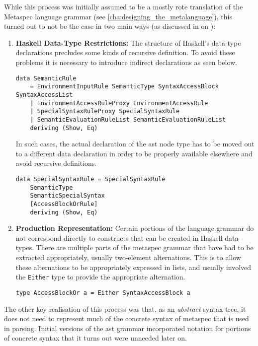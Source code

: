 While this process was initially assumed to be a mostly rote translation of the Metaspec language grammar (see \autoref{cha:designing_the_metalanguage}), this turned out to not be the case in two main ways (as discussed in  on ):
\begin{enumerate}
    \item \textbf{Haskell Data-Type Restrictions:} The structure of Haskell's data-type declarations precludes some kinds of recursive definition.
    To avoid these problems it is necessary to introduce indirect declarations as seen below.
\begin{verbatim}
data SemanticRule
    = EnvironmentInputRule SemanticType SyntaxAccessBlock SyntaxAccessList
    | EnvironmentAccessRuleProxy EnvironmentAccessRule
    | SpecialSyntaxRuleProxy SpecialSyntaxRule
    | SemanticEvaluationRuleList SemanticEvaluationRuleList
    deriving (Show, Eq)
\end{verbatim}
    In such cases, the actual declaration of the \gls{ast} node type has to be moved out to a different data declaration in order to be properly available elsewhere and avoid recursive definitions.
\begin{verbatim}
data SpecialSyntaxRule = SpecialSyntaxRule
    SemanticType
    SemanticSpecialSyntax
    [AccessBlockOrRule]
    deriving (Show, Eq)
\end{verbatim}
    \item \textbf{Production Representation:} Certain portions of the language grammar do not correspond directly to constructs that can be created in Haskell data-types.
    There are multiple parts of the \gls{metaspec} grammar that have had to be extracted appropriately, usually two-element alternations.
    This is to allow these alternations to be appropriately expressed in lists, and usually involved the \texttt{Either} type to provide the appropriate alternation.
\begin{verbatim}
type AccessBlockOr a = Either SyntaxAccessBlock a
\end{verbatim}
\end{enumerate}

The other key realisation of this process was that, as an \textit{abstract} syntax tree, it does not need to represent much of the concrete syntax of \gls{metaspec} that is used in parsing. 
Initial versions of the \gls{ast} grammar incorporated notation for portions of concrete syntax that it turns out were unneeded later on. 

